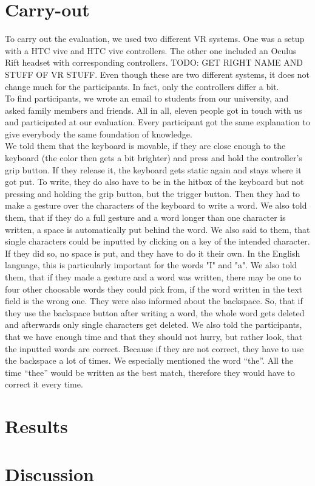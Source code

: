 \section{Carry-out}
To carry out the evaluation, we used two different VR systems. One was a setup with a HTC vive and HTC vive controllers. The other one included an Oculus Rift headset with corresponding controllers. TODO: GET RIGHT NAME AND STUFF OF VR STUFF. Even though these are two different systems, it does not change much for the participants. In fact, only the controllers differ a bit.\\
To find participants, we wrote an email to students from our university, and asked family members and friends. All in all, eleven people got in touch with us and participated at our evaluation. Every participant got the same explanation to give everybody the same foundation of knowledge.\\
We told them that the keyboard is movable, if they are close enough to the keyboard (the color then gets a bit brighter) and press and hold the controller's grip button. If they release it, the keyboard gets static again and stays where it got put. To write, they do also have to be in the hitbox of the keyboard but not pressing and holding the grip button, but the trigger button. Then they had to make a gesture over the characters of the keyboard to write a word. We also told them, that if they do a full gesture and a word longer than one character is written, a space is automatically put behind the word. We also said to them, that single characters could be inputted by clicking on a key of the intended character. If they did so, no space is put, and they have to do it their own. In the English language, this is particularly important for the words "I" and "a". We also told them, that if they made a gesture and a word was written, there may be one to four other choosable words they could pick from, if the word written in the text field is the wrong one. They were also informed about the backspace. So, that if they use the backspace button after writing a word, the whole word gets deleted and afterwards only single characters get deleted. We also told the participants, that we have enough time and that they should not hurry, but rather look, that the inputted words are correct. Because if they are not correct, they have to use the backspace a lot of times. We especially mentioned the word ``the''. All the time ``thee'' would be written as the best match, therefore they would have to correct it every time.\\

\section{Results}



\section{Discussion}